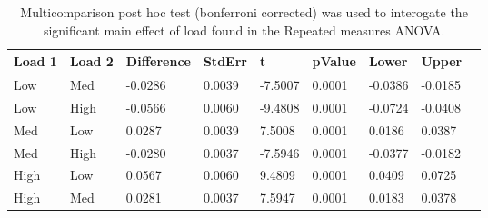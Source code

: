 \begin{table}
\centering
\begin{tabular}[0.2em]{@{}lllllllll@{}}\toprule
Load 1 & Load 2 & Difference & StdErr & t & pValue & Lower & Upper\\\toprule[0.2em]
Low & Med & -0.0286 & 0.0039 & -7.5007 & 0.0001 & -0.0386 & -0.0185 \\\midrule
Low & High & -0.0566 & 0.0060 & -9.4808 & 0.0001 & -0.0724 & -0.0408 \\\midrule
Med & Low & 0.0287 & 0.0039 & 7.5008 & 0.0001 & 0.0186 & 0.0387 \\\midrule
Med & High & -0.0280 & 0.0037 & -7.5946 & 0.0001 & -0.0377 & -0.0182 \\\midrule
High & Low & 0.0567 & 0.0060 & 9.4809 & 0.0001 & 0.0409 & 0.0725 \\\midrule
High & Med & 0.0281 & 0.0037 & 7.5947 & 0.0001 & 0.0183 & 0.0378 \\\bottomrule[0.2em]
\end{tabular}
\caption{Multicomparison post hoc test (bonferroni corrected) was used to interogate the significant main effect of load found in the Repeated measures ANOVA.\label{tabel:tbl_RMAEFC1_PH_load}}
\end{table}
